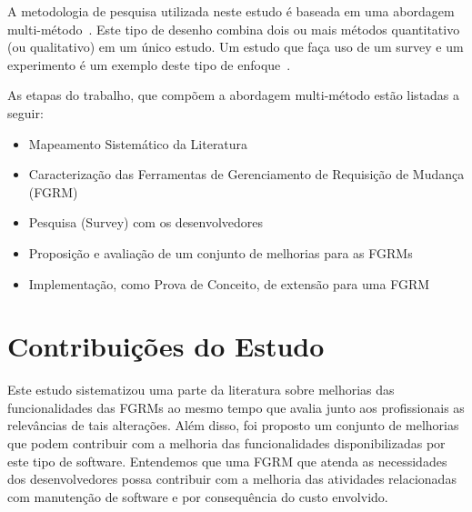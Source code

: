 A metodologia de pesquisa utilizada neste estudo é baseada em uma abordagem
multi-método~\cite{hesse2010mixed}. Este tipo de desenho combina dois ou mais
métodos quantitativo (ou qualitativo) em um único estudo. Um estudo que faça uso
de um survey e um experimento é um exemplo deste tipo de
enfoque~\cite{hesse2010mixed}.


As etapas do trabalho, que compõem a abordagem multi-método estão listadas a
seguir:

\begin{itemize}[(i)]
	\item Mapeamento Sistemático da Literatura~\cite{Petersen2008}
	\item Caracterização das Ferramentas de Gerenciamento de Requisição de
		Mudança (FGRM)
	\item Pesquisa (Survey) com os
		desenvolvedores~\cite{wohlin2012experimentation}
	\item Proposição e avaliação de um conjunto de melhorias para as FGRMs
    \item Implementação, como Prova de Conceito, de extensão para uma FGRM
\end{itemize}

\section{Contribuições do Estudo}
\label{sec:intro-contribuicao}

Este estudo sistematizou uma parte da literatura sobre melhorias das
funcionalidades das FGRMs ao mesmo tempo que avalia junto aos profissionais as
relevâncias de tais alterações. Além disso, foi proposto um conjunto de
melhorias que podem contribuir com a melhoria das funcionalidades
disponibilizadas por este tipo de software. Entendemos que uma FGRM que atenda
as necessidades dos desenvolvedores possa contribuir com a melhoria das
atividades relacionadas com manutenção de software e por consequência do custo
envolvido.

